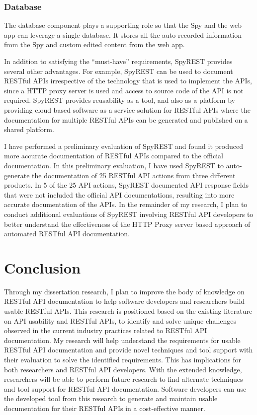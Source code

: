 \documentclass[11pt,oneside]{book}
\begin{document}
\subsubsection{Database}

The database component plays a supporting role so that the Spy and the web app can leverage a single database. It stores all the auto-recorded information from the Spy and custom edited content from the web app.

In addition to satisfying the “must-have” requirements, SpyREST provides several other advantages. For example, SpyREST can be used to document RESTful APIs irrespective of the technology that is used to implement the APIs, since a HTTP proxy server is used and access to source code of the API is not required. SpyREST provides reusability as a tool, and also as a platform by providing cloud based software as a service solution for RESTful APIs where the documentation for multiple RESTful APIs can be generated and published on a shared platform.

I have performed a preliminary evaluation of SpyREST and found it produced more accurate documentation of RESTful APIs compared to the official documentation. In this preliminary evaluation, I have used SpyREST to auto-generate the documentation of 25 RESTful API actions from three different products. In 5 of the 25 API actions, SpyREST documented API response fields that were not included the official API documentations, resulting into more accurate documentation of the APIs. In the remainder of my research, I plan to conduct additional evaluations of SpyREST involving RESTful API developers to better understand the effectiveness of the HTTP Proxy server based approach of automated RESTful API documentation.

\section{Conclusion}

Through my dissertation research, I plan to improve the body of knowledge on RESTful API documentation to help software developers and researchers build usable RESTful APIs. This research is positioned based on the existing literature on API usability and RESTful APIs, to identify and solve unique challenges observed in the current industry practices related to RESTful API documentation. My research will help understand the requirements for usable RESTful API documentation and provide novel techniques and tool support with their evaluation to solve the identified requirements. This has implications for both researchers and RESTful API developers. With the extended knowledge, researchers will be able to perform future research to find alternate techniques and tool support for RESTful API documentation. Software developers can use the developed tool from this research to generate and maintain usable documentation for their RESTful APIs in a cost-effective manner.
\end{document}
